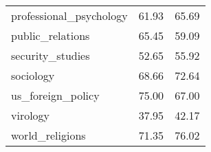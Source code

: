 \begin{table}[t]
\begin{tabular}{L{0.35}C{0.20}C{0.20}}
        professional\_psychology                & 61.93                    & 65.69                      \\
        public\_relations                       & 65.45                    & 59.09                      \\
        security\_studies                       & 52.65                    & 55.92                      \\
        sociology                               & 68.66                    & 72.64                      \\
        us\_foreign\_policy                     & 75.00                    & 67.00                      \\
        virology                                & 37.95                    & 42.17                      \\
        world\_religions                        & 71.35                    & 76.02                      \\
        \bottomrule
    \end{tabular}
\end{table}
\endgroup